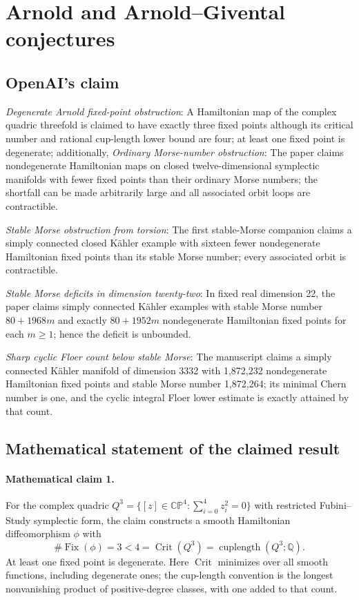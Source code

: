 \documentclass[11pt]{article}
\begin{document}
\section*{Arnold and Arnold–Givental conjectures}

\subsection{OpenAI's claim}
\textit{Degenerate Arnold fixed-point obstruction}: A Hamiltonian map of the complex quadric threefold is claimed to have exactly three fixed points although its critical number and rational cup-length lower bound are four; at least one fixed point is degenerate; additionally, \textit{Ordinary Morse-number obstruction}: The paper claims nondegenerate Hamiltonian maps on closed twelve-dimensional symplectic manifolds with fewer fixed points than their ordinary Morse numbers; the shortfall can be made arbitrarily large and all associated orbit loops are contractible.

\textit{Stable Morse obstruction from torsion}: The first stable-Morse companion claims a simply connected closed Kähler example with sixteen fewer nondegenerate Hamiltonian fixed points than its stable Morse number; every associated orbit is contractible.

\textit{Stable Morse deficits in dimension twenty-two}: In fixed real dimension 22, the paper claims simply connected Kähler examples with stable Morse number $80+1968m$ and exactly $80+1952m$ nondegenerate Hamiltonian fixed points for each $m\ge1$; hence the deficit is unbounded.

\textit{Sharp cyclic Floer count below stable Morse}: The manuscript claims a simply connected Kähler manifold of dimension 3332 with 1,872,232 nondegenerate Hamiltonian fixed points and stable Morse number 1,872,264; its minimal Chern number is one, and the cyclic integral Floer lower estimate is exactly attained by that count.

\subsection{Mathematical statement of the claimed result}
\paragraph{Mathematical claim 1.} For the complex quadric $Q^3=\{[z]\in\mathbb{CP}^4:\sum_{i=0}^4z_i^2=0\}$ with restricted Fubini--Study symplectic form, the claim constructs a smooth Hamiltonian diffeomorphism $\phi$ with \[\#\operatorname{Fix}(\phi)=3<4=\operatorname{Crit}(Q^3)=\operatorname{cuplength}(Q^3;\mathbb Q).\] At least one fixed point is degenerate. Here $\operatorname{Crit}$ minimizes over all smooth functions, including degenerate ones; the cup-length convention is the longest nonvanishing product of positive-degree classes, with one added to that count.
\end{document}

